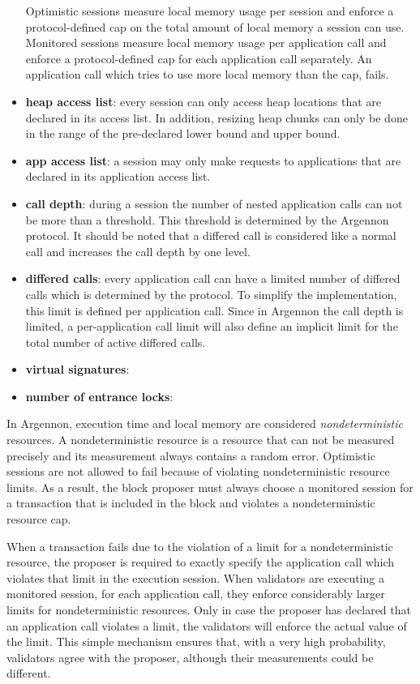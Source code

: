 \begin{itemize}
    Optimistic sessions measure local memory usage per session and enforce a protocol-defined cap on the total amount
    of local memory a session can use. Monitored sessions measure local memory usage per
    application call and enforce a protocol-defined cap for each application call separately. An application call
    which tries to use more local memory than the cap, fails.
    \item \textbf{heap access list}:
    every session can only access heap locations that are declared in its access list. In addition,
    resizing heap chunks can only be done in the range of the pre-declared lower bound and upper bound.
    \item \textbf{app access list}:
    a session may only make requests to applications that are declared in its application access list.
    \item \textbf{call depth}:
    during a session the number of nested application calls can not be more than a threshold. This threshold is
    determined by the Argennon protocol. It should be noted that a differed call is considered like a normal call and
    increases the call depth by one level.
    \item \textbf{differed calls}:
    every application call can have a limited number of differed calls which is determined by the protocol.
    To simplify the implementation, this limit is defined per application call. Since in Argennon the call depth is
    limited, a per-application call limit will also define an implicit limit for the total number of active differed
    calls.
    \item \textbf{virtual signatures}:
    \item \textbf{number of entrance locks}:
\end{itemize}

In Argennon, execution time and local memory are considered \emph{nondeterministic} resources. A nondeterministic
resource is a resource that can not be measured precisely and its measurement always contains a random error.
Optimistic sessions are not allowed to fail because of violating nondeterministic resource limits. As a result, the
block proposer must always choose a monitored session for a transaction that is included in the block and violates a
nondeterministic resource cap.

When a transaction fails due to the violation of a limit for a nondeterministic resource, the proposer is
required to exactly specify the application call which violates that limit in the execution session. When validators are
executing a monitored session, for each application call, they enforce considerably larger limits for
nondeterministic resources. Only in case the proposer has declared that an application call violates a limit, the
validators will enforce the actual value of the limit. This simple mechanism ensures that, with a very high
probability, validators agree with the proposer, although their measurements could be different.


